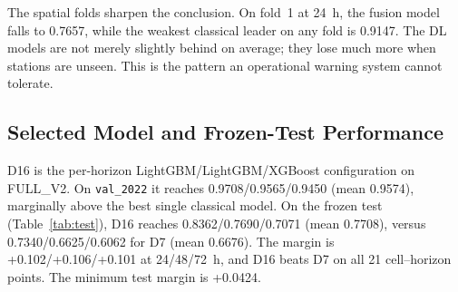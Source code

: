 \documentclass[conference]{IEEEtran}
\begin{document}
The spatial folds sharpen the conclusion. On fold~1 at 24~h, the fusion model falls to 0.7657, while the weakest classical leader on any fold is 0.9147. The DL models are not merely slightly behind on average; they lose much more when stations are unseen. This is the pattern an operational warning system cannot tolerate.

\subsection{Selected Model and Frozen-Test Performance}

D16 is the per-horizon LightGBM/LightGBM/XGBoost configuration on FULL\_V2. On \texttt{val\_2022} it reaches 0.9708/0.9565/0.9450 (mean 0.9574), marginally above the best single classical model. On the frozen test (Table~\ref{tab:test}), D16 reaches 0.8362/0.7690/0.7071 (mean 0.7708), versus 0.7340/0.6625/0.6062 for D7 (mean 0.6676). The margin is +0.102/+0.106/+0.101 at 24/48/72~h, and D16 beats D7 on all 21 cell--horizon points. The minimum test margin is +0.0424.
\end{document}
